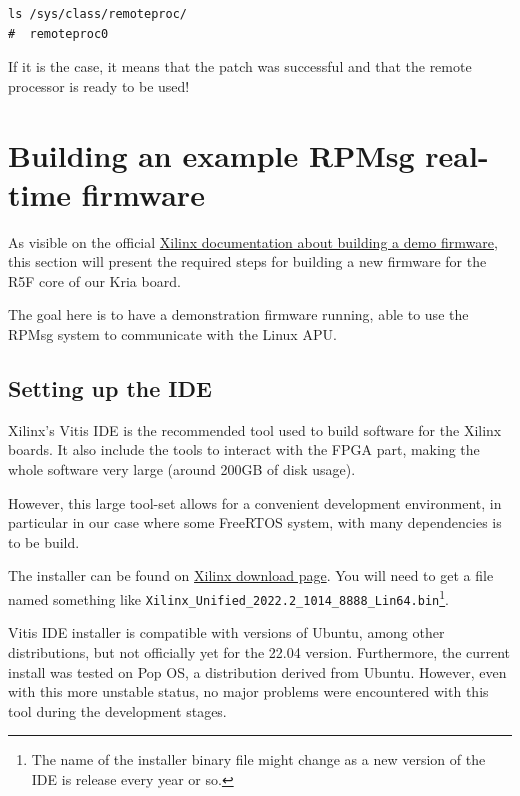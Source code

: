 \documentclass[10pt]{article}
\begin{document}
\begin{verbatim}
ls /sys/class/remoteproc/
#  remoteproc0
\end{verbatim}

If it is the case, it means that the patch was successful and  that the remote processor is
ready to be used!

\section{Building an example RPMsg real-time firmware}
\label{sec:org31558ed}
As visible on the official \href{https://xilinx-wiki.atlassian.net/wiki/spaces/A/pages/1837006921/OpenAMP+Base+Hardware+Configurations\\\#Build-RPU-firmware}{Xilinx documentation about building a demo firmware},
this section will present the required steps for building a new firmware for the R5F
core of our Kria board.

The goal here is to have a demonstration firmware running,
able to use the RPMsg system to communicate with the Linux APU.

\subsection{Setting up the IDE}
\label{sec:org6040e25}
Xilinx's Vitis IDE is the recommended tool used to build software for the Xilinx boards.
It also include the tools to interact with the FPGA part, making the whole
software very large (around 200GB of disk usage).

However, this large tool-set allows for a convenient development environment, in particular
in our case where some FreeRTOS system, with many dependencies is to be build.

The installer can be found on \href{https://www.xilinx.com/support/download/index.html/content/xilinx/en/downloadNav/vitis.html}{Xilinx download page}. You will need to get
a file named something like \texttt{Xilinx\_Unified\_2022.2\_1014\_8888\_Lin64.bin}\footnote{The name of the installer binary file might change as a new version of the IDE
is release every year or so.}.

Vitis IDE installer is compatible with versions of Ubuntu, among other distributions,
but not officially yet for the 22.04 version.
Furthermore, the current install was tested on Pop OS, a distribution derived from Ubuntu.
However, even with this more unstable status, no major problems were encountered
with this tool during the development stages.
\end{document}
